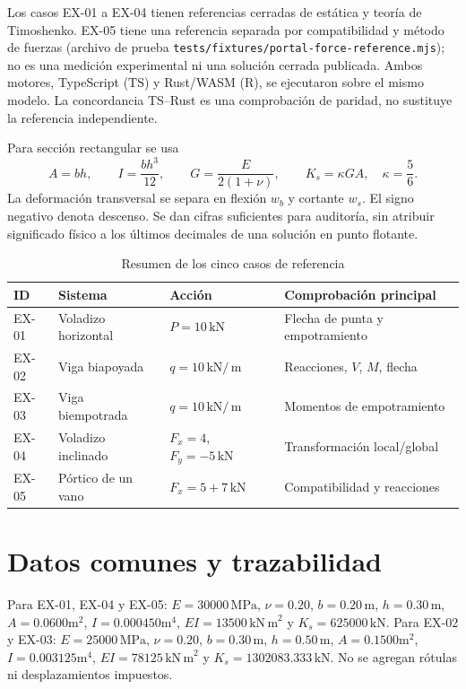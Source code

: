 \documentclass[11pt,a4paper]{article}
\newcommand{\kN}{\,\mathrm{kN}}
\newcommand{\kNm}{\,\mathrm{kN\,m}}
\newcommand{\m}{\,\mathrm{m}}
\newcommand{\MPa}{\,\mathrm{MPa}}
\begin{document}
Los casos EX-01 a EX-04 tienen referencias cerradas de estática y teoría de
Timoshenko. EX-05 tiene una referencia separada por compatibilidad y método
de fuerzas (archivo de prueba
\texttt{tests/fixtures/portal-force-reference.mjs}); no es una medición
experimental ni una solución cerrada publicada. Ambos motores, TypeScript
($\mathrm{TS}$) y Rust/WASM ($\mathrm{R}$), se ejecutaron sobre el mismo modelo.
La concordancia TS--Rust es una comprobación de paridad, no sustituye la
referencia independiente.

Para sección rectangular se usa
\[
A=bh,\qquad I=\frac{bh^3}{12},\qquad
G=\frac{E}{2(1+\nu)},\qquad
K_s=\kappa GA,\quad\kappa=\frac56.
\]
La deformación transversal se separa en flexión $w_b$ y cortante $w_s$.
El signo negativo denota descenso. Se dan cifras suficientes para auditoría,
sin atribuir significado físico a los últimos decimales de una solución en
punto flotante.

\begin{table}[H]\centering
\caption{Resumen de los cinco casos de referencia}
\begin{tabular}{@{}llll@{}}\toprule
ID & Sistema & Acción & Comprobación principal\\\midrule
EX-01 & Voladizo horizontal & $P=10\kN$ & Flecha de punta y empotramiento\\
EX-02 & Viga biapoyada & $q=10\kN/\m$ & Reacciones, $V$, $M$, flecha\\
EX-03 & Viga biempotrada & $q=10\kN/\m$ & Momentos de empotramiento\\
EX-04 & Voladizo inclinado & $F_x=4$, $F_y=-5\kN$ & Transformación local/global\\
EX-05 & Pórtico de un vano & $F_x=5+7\kN$ & Compatibilidad y reacciones\\
\bottomrule\end{tabular}
\end{table}

\section{Datos comunes y trazabilidad}
Para EX-01, EX-04 y EX-05: $E=30000\MPa$, $\nu=0.20$,
$b=0.20\m$, $h=0.30\m$, $A=0.0600\mathrm{m}^2$,
$I=0.000450\mathrm{m}^4$, $EI=13500\kNm^2$ y
$K_s=625000\kN$.
Para EX-02 y EX-03: $E=25000\MPa$, $\nu=0.20$,
$b=0.30\m$, $h=0.50\m$, $A=0.1500\mathrm{m}^2$,
$I=0.003125\mathrm{m}^4$, $EI=78125\kNm^2$ y
$K_s=1302083.333\kN$. No se agregan rótulas ni desplazamientos impuestos.
\end{document}
